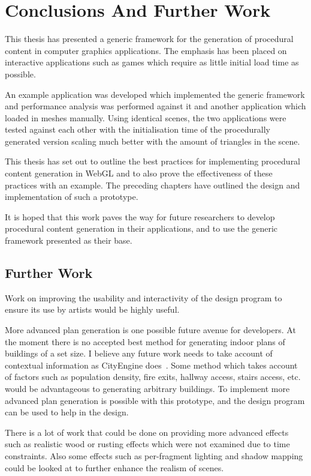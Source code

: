 \chapter{Conclusions And Further Work}
\label{ch:conclusions}
This thesis has presented a generic framework for the generation of procedural content in computer graphics applications.
The emphasis has been placed on interactive applications such as games which require as little initial load time as possible.

An example application was developed which implemented the generic framework and performance analysis was performed against it and another application which loaded in meshes manually.
Using identical scenes, the two applications were tested against each other with the initialisation time of the procedurally generated version scaling much better with the amount of triangles in the scene.

This thesis has set out to outline the best practices for implementing procedural content generation in WebGL and to also prove the effectiveness of these practices with an example.
The preceding chapters have outlined the design and implementation of such a prototype.

It is hoped that this work paves the way for future researchers to develop procedural content generation in their applications, and to use the generic framework presented as their base.

\section{Further Work}
Work on improving the usability and interactivity of the design program to ensure its use by artists would be highly useful.

More advanced plan generation is one possible future avenue for developers.
At the moment there is no accepted best method for generating indoor plans of buildings of a set size.
I believe any future work needs to take account of contextual information as CityEngine does~\cite{parish2001procedural}.
Some method which takes account of factors such as population density, fire exits, hallway access, stairs access, etc. would be advantageous to generating arbitrary buildings.
To implement more advanced plan generation is possible with this prototype, and the design program can be used to help in the design.

There is a lot of work that could be done on providing more advanced effects such as realistic wood or rusting effects which were not examined due to time constraints.
Also some effects such as per-fragment lighting and shadow mapping could be looked at to further enhance the realism of scenes.

